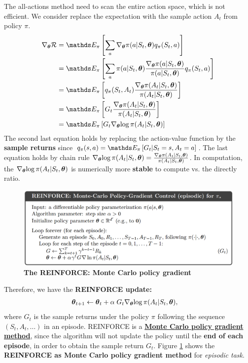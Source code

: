 \documentclass[11pt]{article}
\begin{document}
The all-actions method need to scan the entire action space, which is not efficient. We consider replace the expectation with the sample action $A_{t}$ from policy $\pi$.
\begin{align*}
\grad{\mb{\theta}}{\cR} &= \E{\pi}{\sum_{a}\grad{\mb{\theta}}{\pi(a|S_{t}, \mb{\theta})}q_{\pi}(S_{t}, a) } \\
&= \E{\pi}{\sum_{a}\pi(a|S_{t}, \mb{\theta})\frac{\grad{\mb{\theta}}{\pi(a|S_{t}, \mb{\theta})}}{\pi(a|S_{t}, \mb{\theta})}q_{\pi}(S_{t}, a) } \\
&= \E{\pi}{q_{\pi}(S_{t}, A_{t}) \frac{\grad{\mb{\theta}}{\pi(A_{t}|S_{t}, \mb{\theta})}}{\pi(A_{t}|S_{t}, \mb{\theta})} } \\
&= \E{\pi}{G_{t}\frac{\grad{\mb{\theta}}{\pi(A_{t}|S_{t}, \mb{\theta})}}{\pi(A_{t}|S_{t}, \mb{\theta})} } \\
&= \E{\pi}{G_{t}\grad{\mb{\theta}}{\log\pi(A_{t}|S_{t}, \mb{\theta})} }
\end{align*} The second last equation holds by replacing the action-value function by the \textbf{sample returns}  since  $q_{\pi}(s, a)= \E{\pi}{G_{t} | S_{t}=s, A_{t}=a}$. The last equation holds by chain rule $\nabla_{\boldsymbol{\theta}}{\log\pi(A_{t}|S_{t}, \boldsymbol{\theta})}  = \frac{\nabla_{\boldsymbol{\theta}}{\pi(A_{t}|S_{t}, \boldsymbol{\theta})}}{\pi(A_{t}|S_{t}, \boldsymbol{\theta})}$. In computation, the $\nabla_{\boldsymbol{\theta}}{\log\pi(A_{t}|S_{t}, \boldsymbol{\theta})}$ is numerically more \textbf{stable} to compute vs. the directly ratio.
\begin{figure}
\begin{minipage}[t]{1\linewidth}
  \centering
  \centerline{\includegraphics[scale = 0.3]{reinforce_algo.png}}
\end{minipage}
\caption{\footnotesize{\textbf{The REINFORCE: Monte Carlo policy gradient}}}
\label{fig: reinforce_algo}
\end{figure}
Therefore, we have the \textbf{REINFORCE update:}
\begin{align}
\boldsymbol{\theta}_{t+1} &\leftarrow \boldsymbol{\theta}_{t} + \alpha \;G_{t}\nabla_{\boldsymbol{\theta}}{\log\pi(A_{t}|S_{t}, \boldsymbol{\theta})}, \label{eqn: reinforce_update}
\end{align} where $G_{t}$ is the sample returns under the policy $\pi$ following the sequence $(S_{t}, A_{t}, \ldots)$ in an episode.  REINFORCE is a \underline{\textbf{Monte Carlo policy gradient method}}, since the algorithm will not update the policy until the \textbf{end of each episode}, in order to obtain the sample return $G_{t}$. Figure \ref{fig: reinforce_algo} shows the \textbf{REINFORCE as Monte Carlo policy gradient method} for \emph{episodic task}.
\end{document}
